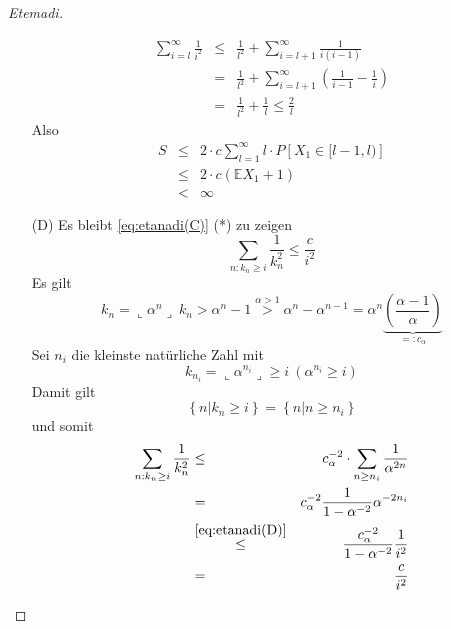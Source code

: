\documentclass[10pt,a4paper]{report}
\numberwithin{equation}{section}
\numberwithin{figure}{section}
\theoremstyle{plain}
\theoremstyle{definition}
\theoremstyle{remark}
\theoremstyle{plain}
\newcommand{\1}{ \mathbb{1} } %
\begin{document}
\begin{proof}[Etemadi]
\begin{itemize}
    \begin{eqnarray*}
      \sum_{i=l}^{\infty}\frac{1}{i^{2}} & \leq & \frac{1}{l^{2}}+\sum_{i=l+1}^{\infty}\frac{1}{i\left(i-1\right)}\\
      & = & \frac{1}{l^{2}}+\sum_{i=l+1}^{\infty}\left(\frac{1}{i-1}-\frac{1}{i}\right)\\
      & = & \frac{1}{l^{2}}+\frac{1}{l}\leq\frac{2}{l}
    \end{eqnarray*}
    Also
    \begin{eqnarray*}
      S & \leq & 2\cdot c\sum_{l=1}^{\infty}l\cdot P\left[X_{1}\in[l-1,l)\right]\\
      & \leq & 2\cdot c\left(\mathbb{E}X_{1}+1\right)\\
      & < & \infty
    \end{eqnarray*}

  \item [{(D)}] Es bleibt \ref{eq:etanadi(C)} ({*}) zu zeigen
    \[
    \sum_{n:k_{n}\geq i}\frac{1}{k_{n}^{2}}\leq\frac{c}{i^{2}}
    \]
    Es gilt
    \[
    k_{n}=\llcorner\alpha^{n}\lrcorner\ k_{n}>\alpha^{n}-1\overset{\alpha>1}{>}\alpha^{n}-\alpha^{n-1}=\alpha^{n}\underset{=:c_{\alpha}}{\underbrace{\left(\frac{\alpha-1}{\alpha}\right)}}
    \]
    Sei $n_{i}$ die kleinste natürliche Zahl mit 
    \begin{equation}
      k_{n_{i}}=\llcorner\alpha^{n_{i}}\lrcorner\geq i\ \left(\alpha^{n_{i}}\geq i\right)\label{eq:etanadi(D)}
    \end{equation}
    Damit gilt
    \[
    \left\{ n|k_{n}\geq i\right\} =\left\{ n|n\geq n_{i}\right\} 
    \]
    und somit
    \begin{eqnarray*}
      \sum_{n:k_{n}\geq i}\frac{1}{k_{n}^{2}} & \leq & c_{\alpha}^{-2}\cdot\sum_{n\geq n_{i}}\frac{1}{\alpha^{2n}}\\
      & = & c_{\alpha}^{-2}\frac{1}{1-\alpha^{-2}}\alpha^{-2n_{i}}\\
      & \overset{\ref{eq:etanadi(D)}}{\leq} & \frac{c_{\alpha}^{-2}}{1-\alpha^{-2}}\frac{1}{i^{2}}\\
      & = & \frac{c}{i^{2}}
    \end{eqnarray*}

  \end{itemize}
\end{proof}
\end{document}
